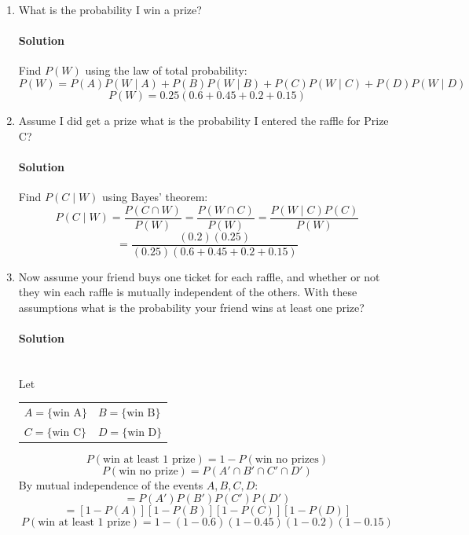 ﻿\documentclass[12pt]{article}
\begin{document}
\begin{enumerate}[label=(\alph*), leftmargin=*]
\item What is the probability I win a prize?
\paragraph{Solution}\mbox{} Find $P(W)$ using the law of total probability:
\[
P(W)=P(A)P(W\mid A)+P(B)P(W\mid B)+P(C)P(W\mid C)+P(D)P(W\mid D)
\]
\[
\boxed{P(W)=0.25(0.6+0.45+0.2+0.15)}
\]
\newpage
\item Assume I did get a prize what is the probability I entered the raffle for Prize C?
\paragraph{Solution}\mbox{} Find $P(C\mid W)$ using Bayes' theorem:
\[
P(C\mid W)=\frac{P(C\cap W)}{P(W)}
=\frac{P(W\cap C)}{P(W)}
=\frac{P(W\mid C)P(C)}{P(W)}
\]
\[
\boxed{
=\frac{(0.2)(0.25)}{(0.25)(0.6+0.45+0.2+0.15)}
}
\]
\item Now assume your friend buys one ticket for each raffle, and whether or not they win each raffle is mutually independent of the others. With these assumptions what is the probability your friend wins at least one prize?
\paragraph{Solution}\mbox{}\\
Let
\begin{center}
\renewcommand{\arraystretch}{1.5}
\begin{tabular}{ll}
$A=\{\text{win A}\}$ & $B=\{\text{win B}\}$ \\
$C=\{\text{win C}\}$ & $D=\{\text{win D}\}$
\end{tabular}
\end{center}
\[
P(\text{win at least 1 prize})=1-P(\text{win no prizes})
\]
\[
P(\text{win no prize})=P(A'\cap B'\cap C'\cap D')
\]
By mutual independence of the events $A, B, C, D$:
\[
=P(A')P(B')P(C')P(D')
\]
\[
=[1-P(A)][1-P(B)][1-P(C)][1-P(D)]
\]
\[
\boxed{
P(\text{win at least 1 prize})
=1-(1-0.6)(1-0.45)(1-0.2)(1-0.15)
}
\]
\end{enumerate}
\end{document}
